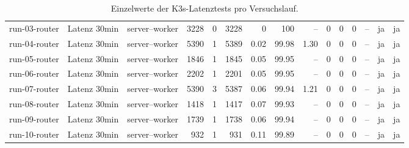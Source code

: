 \begin{table}
\begin{tabular}{l l p{3.2cm} r r r r r r r r r r r r}
run-03-router & Latenz 30min & server--worker & 3228 & 0 & 3228 & 0 & 100 & -- & 0 & 0 & 0 & -- & ja & ja \\
run-04-router & Latenz 30min & server--worker & 5390 & 1 & 5389 & 0.02 & 99.98 & 1.30 & 0 & 0 & 0 & -- & ja & ja \\
run-05-router & Latenz 30min & server--worker & 1846 & 1 & 1845 & 0.05 & 99.95 & -- & 0 & 0 & 0 & -- & ja & ja \\
run-06-router & Latenz 30min & server--worker & 2202 & 1 & 2201 & 0.05 & 99.95 & -- & 0 & 0 & 0 & -- & ja & ja \\
run-07-router & Latenz 30min & server--worker & 5390 & 3 & 5387 & 0.06 & 99.94 & 1.21 & 0 & 0 & 0 & -- & ja & ja \\
run-08-router & Latenz 30min & server--worker & 1418 & 1 & 1417 & 0.07 & 99.93 & -- & 0 & 0 & 0 & -- & ja & ja \\
run-09-router & Latenz 30min & server--worker & 1739 & 1 & 1738 & 0.06 & 99.94 & -- & 0 & 0 & 0 & -- & ja & ja \\
run-10-router & Latenz 30min & server--worker & 932 & 1 & 931 & 0.11 & 99.89 & -- & 0 & 0 & 0 & -- & ja & ja \\
\bottomrule
\end{tabular}
\caption{Einzelwerte der K3s-Latenztests pro Versuchslauf.}
\label{tab:appendix-k3s-latency-runs}
\end{table}
